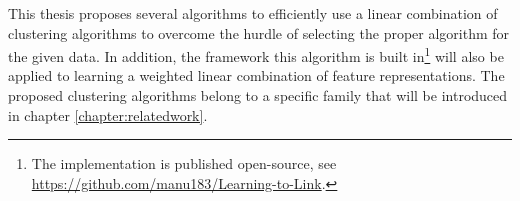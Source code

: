 This thesis proposes several algorithms to efficiently use a linear combination of clustering algorithms to overcome the hurdle of selecting the proper algorithm for the given data. In addition, the framework this algorithm is built in\footnote{The implementation is published open-source, see \url{https://github.com/manu183/Learning-to-Link}.} will also be applied to learning a weighted linear combination of feature representations. The proposed clustering algorithms belong to a specific family that will be introduced in chapter \ref{chapter:relatedwork}.